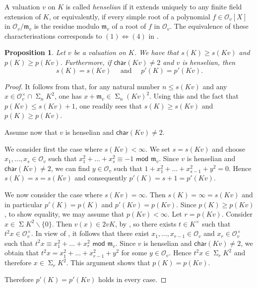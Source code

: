\documentclass[12pt,leqno]{amsart}
\newcommand{\mc}[1]{\mathcal{#1}}
\newcommand{\mg}[1]{#1^{\times}}
\renewcommand{\setminus}{\smallsetminus}
\DeclareMathOperator{\newsum}{\mathsf{\Sigma}}
\renewcommand{\sum}{\newsum}
\newcommand{\sums}[1]{\sum\!{#1}^2}
\newcommand{\sos}[2]{\sum_{#1}\!{#2}^2}
\newcommand{\mfm}{\mathfrak{m}}
\newcommand{\car}{\mathsf{char}}
\renewcommand{\leq}{\leqslant}
\renewcommand{\geq}{\geqslant}
\renewcommand{\bmod}{\,\,\mathsf{mod}\,\,}
\numberwithin{equation}{section}
\newtheorem{prop}[equation]{Proposition}
\theoremstyle{definition}
\theoremstyle{plain}
\begin{document}
A valuation $v$ on $K$ is called \emph{henselian} if it extends uniquely to any finite field extension of $K$, or equivalently, if every simple root of a polynomial $f\in\mc{O}_v[X]$ in $\mc{O}_v/\mfm_v$ is the residue modulo $\mfm_v$ of a root of $f$ in $\mc{O}_v$. 
The equivalence of these characterisations corresponds to $(1)\Leftrightarrow (4)$ in \cite[Theorem 4.1.3]{EP05}.

\begin{prop}\label{inequality p'}
Let $v$ be a valuation on $K$.
We have that  $s(K)\geq s(Kv)$ and $p(K)\geq p(Kv)$.  
Furthermore, if $\car(Kv)\neq 2$ and $v$ is henselian, then 
\[s(K)=s(Kv)\quad \mbox{ and }\quad p'(K)= p'(Kv).\]
\end{prop}

\begin{proof}
It follows from  that, for any natural number $n\leq s(Kv)$ and any $x\in\mg{\mc{O}}_v\cap\sos{n}{K}$, one has $x+\mfm_v\in\sos{n}{(Kv)}$.
Using this and the fact that $p(Kv)\leq s(Kv)+1$, one readily sees that $s(K)\geq s(Kv)$ and $p(K)\geq p(Kv)$. 

Assume now that $v$ is henselian and $\car(Kv)\neq 2$.

We consider first the case where $s(Kv)<\infty$.
We set $s=s(Kv)$ and choose $x_1,\dots,x_s\in {\mc O}_v$ such that $x_1^2+\dots+x_s^2 \equiv -1\bmod \mfm_v$. 
Since $v$ is henselian and $\car(Kv)\neq 2$, we can  find $y\in \mc{O}_v$ such that $1+x_1^2+\dots+x_{s-1}^2+y^2 =0$. Hence $s(K)=s=s(Kv)$ and consequently $p'(K)=s+1=p'(Kv)$.

We now consider the case where $s(Kv)=\infty$. Then $s(K)=\infty=s(Kv)$ and in particular $p'(K)=p(K)$ and $p'(Kv)=p(Kv)$. Since $p(K)\geq p(Kv)$, to show equality, we may assume that $p(Kv)<\infty$. Let $r=p(Kv)$.
Consider $x\in \sums{K}\setminus\{0\}$.
Then $v(x)\in 2 vK$, by , so there exists $t\in \mg K$ such that $t^2x\in\mg{\mc{O}}_v$.
In view of , it follows that there exist $x_1,\dots,x_{r-1}\in \mc{O}_v$ and $x_r\in\mg{\mc{O}}_v$ such that 
$t^2x\equiv x_1^2+\dots+x_r^2\bmod \mfm_v$.
Since $v$ is henselian and $\car(Kv)\neq 2$, we obtain that 
$t^2x=x_1^2+\dots+x_{r-1}^2+y^2$ for some $y\in \mc{O}_v$. Hence $t^2x\in \sos{r}{K}$ and therefore $x\in\sos{r}{K}$.
This argument shows that $p(K)=p(Kv)$. 

Therefore $p'(K)=p'(Kv)$ holds in every case.
\end{proof}
\end{document}
